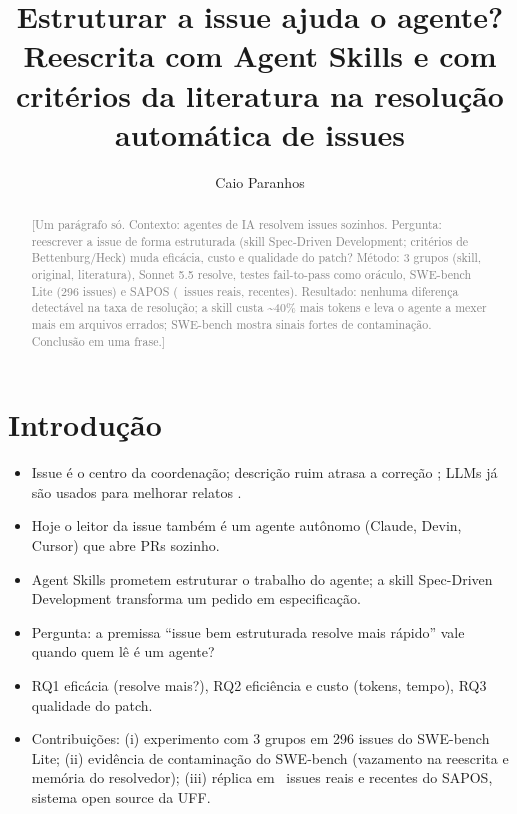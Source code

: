 \documentclass[sigconf]{acmart}
\newcommand{\topicos}[1]{{\color{gray}\begin{itemize}\setlength\itemsep{0pt}#1\end{itemize}}}
\begin{document}
\title{Estruturar a issue ajuda o agente? Reescrita com Agent Skills e com critérios da literatura na resolução automática de issues}

\author{Caio Paranhos}

\renewcommand{\shortauthors}{Paranhos}

\begin{abstract}
\textcolor{gray}{[Um parágrafo só. Contexto: agentes de IA resolvem issues sozinhos. Pergunta: reescrever a issue de forma estruturada (skill Spec-Driven Development; critérios de Bettenburg/Heck) muda eficácia, custo e qualidade do patch? Método: 3 grupos (skill, original, literatura), Sonnet 5.5 resolve, testes fail-to-pass como oráculo, SWE-bench Lite (296 issues) e SAPOS (\SaposN\ issues reais, recentes). Resultado: nenhuma diferença detectável na taxa de resolução; a skill custa \textasciitilde40\% mais tokens e leva o agente a mexer mais em arquivos errados; SWE-bench mostra sinais fortes de contaminação. Conclusão em uma frase.]}
\end{abstract}


\maketitle

\section{Introdução}
\topicos{
\item Issue é o centro da coordenação; descrição ruim atrasa a correção \cite{bettenburg2008,zimmermann2010}; LLMs já são usados para melhorar relatos \cite{acharya2025}.
\item Hoje o leitor da issue também é um agente autônomo (Claude, Devin, Cursor) que abre PRs sozinho.
\item Agent Skills prometem estruturar o trabalho do agente; a skill Spec-Driven Development \cite{osmani2024skills} transforma um pedido em especificação.
\item Pergunta: a premissa ``issue bem estruturada resolve mais rápido'' vale quando quem lê é um agente?
\item RQ1 eficácia (resolve mais?), RQ2 eficiência e custo (tokens, tempo), RQ3 qualidade do patch.
\item Contribuições: (i) experimento com 3 grupos em 296 issues do SWE-bench Lite; (ii) evidência de contaminação do SWE-bench (vazamento na reescrita e memória do resolvedor); (iii) réplica em \SaposN\ issues reais e recentes do SAPOS, sistema open source da UFF.
}
\end{document}
